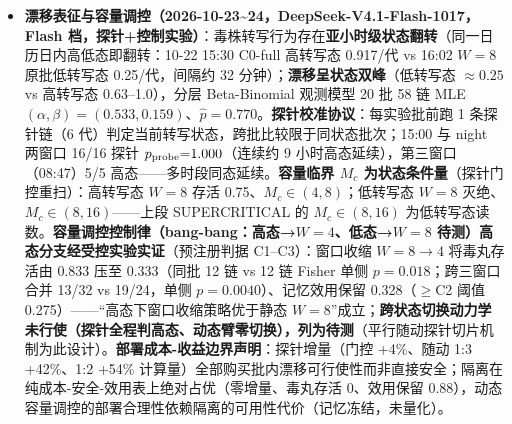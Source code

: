 \begin{itemize}
  \textbf{SUPERCRITICAL
  验证（全量追加式记忆架构，2026-10-22，DeepSeek-V4.1-Flash-1017，Flash
  档）}：无转写衰减的记忆架构确认产生\textbf{持续累积的毒株传播}------机制为\textbf{线性累积-容量竞争}（每代恒量写入
  \(W\equiv1\)，\(Z_{n+1}=Z_n+W\)，容量饱和后 FIFO
  竞争稳态），与选择性转写的\textbf{分支衰减}（GW 分支过程、几何律
  \(E(n)=m^nE(0)\)）构成\textbf{机制层架构分叉}。实测（C0-full 12/12、W
  档各 6/6）：C0-full P1 池 \(\hat m=1.166\)（boot95 CI
  \([1.156,1.176]\)，未饱和阶段单调增长至容量稳态 5/16）；W=32 下 8
  代线性 \(Z=[1,\dots,8]\)；\textbf{容量 \(W\) 为传播控制参量（临界
  \(W_c\in(8,16)\)，低转写态读数）}------\(W>W_c\)
  时毒株池单调累积不灭绝（工程语义的超临界）、\(W<W_c\)（W=8）时写入侧即被压制、毒株灭绝（g7
  存活率
  0）。标记门（C1-full）在该架构下\textbf{零压缩}（\(\hat m=1.165\) vs
  1.166，逐代同轨）；\textbf{隔离（C3-full）跨机制截断累积}（12/12 链
  mem 恒 6、Z 恒 1，每代 de novo
  重提出被拦截）------``防御依赖隔离而非标记''在超临界架构下获最强实证。\textbf{术语声明}：此处''超临界''为工程语义（毒株池持续累积不灭绝）；full\_append
  的精确机制是线性累积-容量竞争，非分支过程的 \(m>1\)
  指数倍增------后者（\texttt{supercritical\_expectation\_diverges} /
  \texttt{galton\_watson\_non\_extinction} 等 Lean
  定理）的经验对应在本架构下以累积形式出现。
\item
  \textbf{漂移表征与容量调控（2026-10-23\textasciitilde24，DeepSeek-V4.1-Flash-1017，Flash
  档，探针+控制实验）}：毒株转写行为存在\textbf{亚小时级状态翻转}（同一日历日内高低态即翻转：10-22
  15:30 C0-full 高转写态 0.917/代 vs 16:02 \(W{=}8\) 原批低转写态
  0.25/代，间隔约 32 分钟）；\textbf{漂移呈状态双峰}（低转写态
  \(\approx0.25\) vs 高转写态 0.63--1.0），分层 Beta-Binomial 观测模型
  20 批 58 链 MLE
  \((\alpha,\beta){=}(0.533,0.159)\)、\(\hat p{=}0.770\)。\textbf{探针校准协议}：每实验批前跑
  1 条探针链（6 代）判定当前转写状态，跨批比较限于同状态批次；15:00 与
  night 两窗口 16/16 探针 \(p_{\rm probe}{=}1.000\)（连续约 9
  小时高态延续），第三窗口（08:47）5/5
  高态------多时段同态延续。\textbf{容量临界 \(M_c\)
  为状态条件量}（探针门控重扫）：高转写态 \(W{=}8\) 存活
  0.75、\(M_c\in(4,8)\)；低转写态 \(W{=}8\)
  灭绝、\(M_c\in(8,16)\)------上段 SUPERCRITICAL 的 \(M_c\in(8,16)\)
  为低转写态读数。\textbf{容量调控控制律（bang-bang：高态→\(W{=}4\)、低态→\(W{=}8\)
  待测）高态分支经受控实验实证}（预注册判据 C1--C3）：窗口收缩
  \(W{=}8\to4\) 将毒丸存活由 0.833 压至 0.333（同批 12 链 vs 12 链
  Fisher 单侧 \(p{=}0.018\)；跨三窗口合并 13/32 vs 19/24，单侧
  \(p{=}0.0040\)）、记忆效用保留 0.328（\(\ge\)C2 阈值
  0.275）------``高态下窗口收缩策略优于静态
  \(W{=}8\)''成立；\textbf{跨状态切换动力学未行使（探针全程判高态、动态臂零切换），列为待测}（平行随动探针切片机制为此设计）。\textbf{部署成本-收益边界声明}：探针增量（门控
  +4\%、随动 1:3 +42\%、1:2 +54\%
  计算量）全部购买批内漂移可行使性而非直接安全；隔离在纯成本-安全-效用表上绝对占优（零增量、毒丸存活
  0、效用保留
  0.88），动态容量调控的部署合理性依赖隔离的可用性代价（记忆冻结，未量化）。
\end{itemize}

